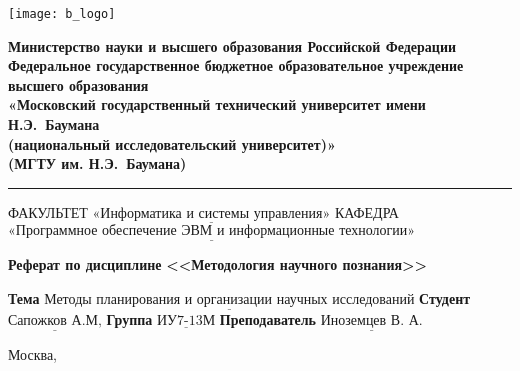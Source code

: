 \thispagestyle{empty}

\noindent \begin{minipage}{0.15\textwidth}
	\texttt{[image: b\_logo]}
\end{minipage}
\noindent\begin{minipage}{0.85\textwidth}\centering
	\textbf{Министерство науки и высшего образования Российской Федерации}\\
	\textbf{Федеральное государственное бюджетное образовательное учреждение высшего образования}\\
	\textbf{«Московский государственный технический университет имени Н.Э.~Баумана}\\
	\textbf{(национальный исследовательский университет)»}\\
	\textbf{(МГТУ им. Н.Э.~Баумана)}
\end{minipage}

\noindent\rule{\linewidth}{3pt}
\newline\newline
\noindent ФАКУЛЬТЕТ $\underline{\text{«Информатика и системы управления»}}$ \newline\newline
\noindent КАФЕДРА $\underline{\text{«Программное обеспечение ЭВМ и информационные технологии»}}$

\vspace{1cm}

\begin{center}
	\noindent\begin{minipage}{1.3\textwidth}\centering
		\Large\textbf{Реферат по дисциплине}\newline
		\textbf{<<Методология научного познания>>}\newline
	\end{minipage}
\end{center}

\noindent\textbf{Тема} $\underline{\text{Методы планирования и организации научных исследований}}$\newline\newline
\noindent\textbf{Студент} $\underline{\text{Сапожков А.М,}}$\newline\newline
\noindent\textbf{Группа} $\underline{\text{ИУ7-13М}}$\newline\newline
\noindent\textbf{Преподаватель} $\underline{\text{Иноземцев В. А.}}$\newline

\begin{center}
	\vfill
	Москва,~\the\year
\end{center}
\clearpage
